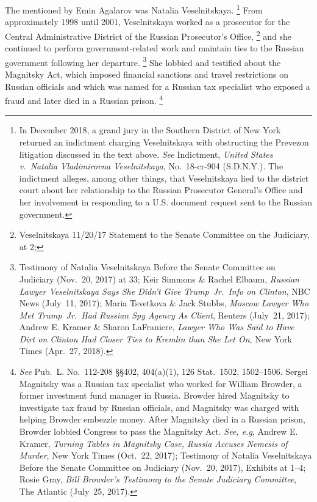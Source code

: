 The  mentioned by Emin Agalarov was Natalia Veselnitskaya.%
\footnote{In December 2018, a grand jury in the Southern District of New York returned an indictment charging Veselnitskaya with obstructing the Prevezon litigation discussed in the text above.
\textit{See} Indictment, \textit{United States v.\ Natalia Vladimirovna Veselnitskaya}, No.~18-cr-904 (S.D.N.Y.).
The indictment alleges, among other things, that Veselnitskaya lied to the district court about her relationship to the Russian Prosecutor General's Office and her involvement in responding to a U.S. document request sent to the Russian government.}
From approximately 1998 until 2001, Veselnitskaya worked as a prosecutor for the Central Administrative District of the Russian Prosecutor's Office,%
\footnote{Veselnitskaya 11/20/17 Statement to the Senate Committee on the Judiciary, at 2;
}
and she continued to perform government-related work and maintain ties to the Russian government following her departure.%
\footnote{Testimony of Natalia Veselnitskaya Before the Senate Committee on Judiciary (Nov.~20, 2017) at 33;
Keir Simmons \& Rachel Elbaum, \textit{Russian Lawyer Veselnitskaya Says She Didn't Give Trump~Jr.\ Info on Clinton}, NBC News (July~11, 2017);
Maria Tsvetkova \& Jack Stubbs, \textit{Moscow Lawyer Who Met Trump~Jr.\ Had Russian Spy Agency As Client}, Reuters (July~21, 2017);
Andrew E. Kramer \& Sharon LaFraniere, \textit{Lawyer Who Was Said to Have Dirt on Clinton Had Closer Ties to Kremlin than She Let On}, New York Times (Apr.~27, 2018).}
She lobbied and testified about the Magnitsky Act, which imposed financial sanctions and travel restrictions on Russian officials and which was named for a Russian tax specialist who exposed a fraud and later died in a Russian prison.%
\footnote{\textit{See} Pub.\ L. No.~112-208 \S\S 402, 404(a)(1), 126 Stat.~1502, 1502--1506.
Sergei Magnitsky was a Russian tax specialist who worked for William Browder, a former investment fund manager in Russia.
Browder hired Magnitsky to investigate tax fraud by Russian officials, and Magnitsky was charged with helping Browder embezzle money.
After Magnitsky died in a Russian prison, Browder lobbied Congress to pass the Magnitsky Act.
\textit{See, e.g}, Andrew E. Kramer, \textit{Turning Tables in Magnitsky Case, Russia Accuses Nemesis of Murder}, New York Times (Oct.~22, 2017);
Testimony of Natalia Veselnitskaya Before the Senate Committee on Judiciary (Nov.~20, 2017), Exhibits at 1--4;
Rosie Gray, \textit{Bill Browder's Testimony to the Senate Judiciary Committee}, The Atlantic (July~25, 2017).}
